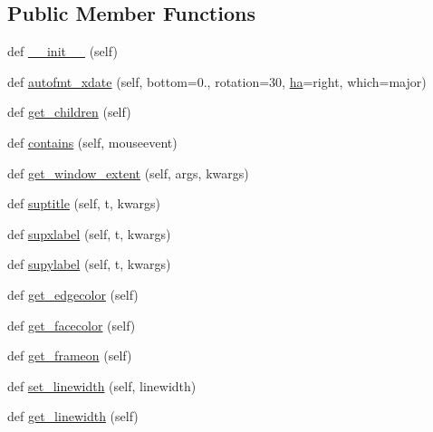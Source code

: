 \subsection*{Public Member Functions}
\begin{DoxyCompactItemize}
\item 
def \hyperlink{classmatplotlib_1_1figure_1_1FigureBase_a9c1a55ea3927571cbbfe5bf3d04ade4c}{\+\_\+\+\_\+init\+\_\+\+\_\+} (self)
\item 
def \hyperlink{classmatplotlib_1_1figure_1_1FigureBase_aff4462189d88243c3cd2c8483e7112e6}{autofmt\+\_\+xdate} (self, bottom=0., rotation=30, \hyperlink{classmatplotlib_1_1figure_1_1FigureBase_a3a858504ac6968b3f7113edf45bbc931}{ha}=\textquotesingle{}right\textquotesingle{}, which=\textquotesingle{}major\textquotesingle{})
\item 
def \hyperlink{classmatplotlib_1_1figure_1_1FigureBase_a199c4bf83686cbdca66073296b3b6541}{get\+\_\+children} (self)
\item 
def \hyperlink{classmatplotlib_1_1figure_1_1FigureBase_a7edf2e7965170046f9e6fc890545d6cd}{contains} (self, mouseevent)
\item 
def \hyperlink{classmatplotlib_1_1figure_1_1FigureBase_a2e5e6719b6231059c61e289c3b81609b}{get\+\_\+window\+\_\+extent} (self, args, kwargs)
\item 
def \hyperlink{classmatplotlib_1_1figure_1_1FigureBase_a863f7a43e8be9dffccc3e687c62e6b71}{suptitle} (self, t, kwargs)
\item 
def \hyperlink{classmatplotlib_1_1figure_1_1FigureBase_a7cb085ad52231d27a4ae37b1015221b8}{supxlabel} (self, t, kwargs)
\item 
def \hyperlink{classmatplotlib_1_1figure_1_1FigureBase_ad0a62077059599432dab8f5df4f75137}{supylabel} (self, t, kwargs)
\item 
def \hyperlink{classmatplotlib_1_1figure_1_1FigureBase_aabc92e00048c43c96bd245592bcb3f10}{get\+\_\+edgecolor} (self)
\item 
def \hyperlink{classmatplotlib_1_1figure_1_1FigureBase_a08d5ecf5957f593a3e772c107c612d5a}{get\+\_\+facecolor} (self)
\item 
def \hyperlink{classmatplotlib_1_1figure_1_1FigureBase_a64ada9af47f94b0121abadf8e0014cdf}{get\+\_\+frameon} (self)
\item 
def \hyperlink{classmatplotlib_1_1figure_1_1FigureBase_a21f5fad0e2090950172ce9a05828e811}{set\+\_\+linewidth} (self, linewidth)
\item 
def \hyperlink{classmatplotlib_1_1figure_1_1FigureBase_a66d97bf19b17962ff2e31af1241f1440}{get\+\_\+linewidth} (self)

\end{DoxyCompactItemize}
